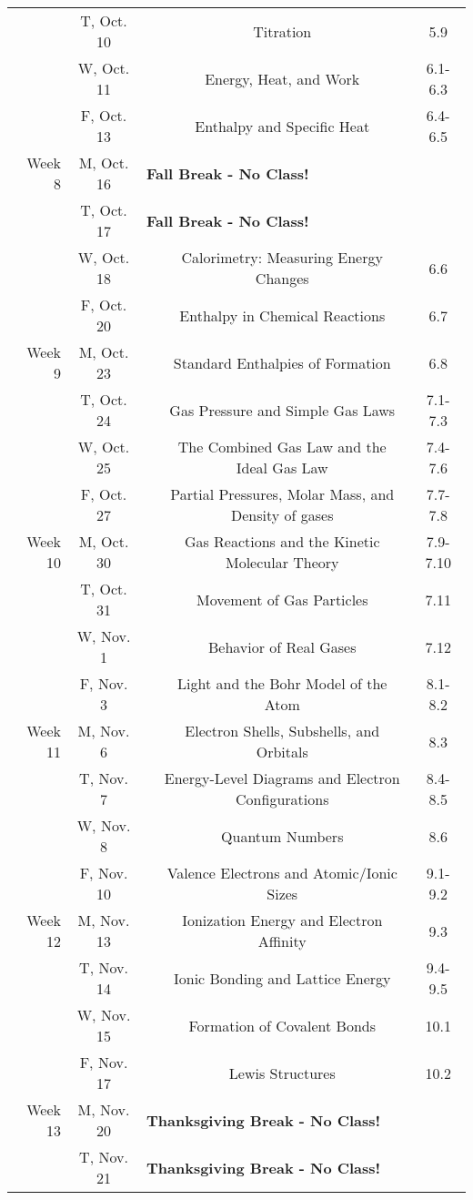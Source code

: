 \begin{tabular}{rcccc}
& T, Oct. 10&& Titration & 5.9\\
& W, Oct. 11&& Energy, Heat, and Work & 6.1-6.3\\
& F, Oct. 13&& Enthalpy and Specific Heat & 6.4-6.5\\
\midrule
Week 8 & M, Oct. 16& \multicolumn{3}{l}{\textbf{Fall Break - No Class!}}\\
& T, Oct. 17& \multicolumn{3}{l}{\textbf{Fall Break - No Class!}}\\
& W, Oct. 18&& Calorimetry: Measuring Energy Changes & 6.6\\
& F, Oct. 20&& Enthalpy in Chemical Reactions & 6.7\\
\midrule
Week 9 & M, Oct. 23&& Standard Enthalpies of Formation & 6.8\\
& T, Oct. 24&& Gas Pressure and Simple Gas Laws & 7.1-7.3\\
& W, Oct. 25&& The Combined Gas Law and the Ideal Gas Law & 7.4-7.6\\
& F, Oct. 27&& Partial Pressures, Molar Mass, and Density of gases & 7.7-7.8\\
\midrule
Week 10 & M, Oct. 30&& Gas Reactions and the Kinetic Molecular Theory & 7.9-7.10\\
& T, Oct. 31&& Movement of Gas Particles & 7.11\\
& W, Nov. 1&& Behavior of Real Gases & 7.12\\
& F, Nov. 3&& Light and the Bohr Model of the Atom & 8.1-8.2\\
\midrule
Week 11 & M, Nov. 6&& Electron Shells, Subshells, and Orbitals & 8.3\\
& T, Nov. 7&& Energy-Level Diagrams and Electron Configurations & 8.4-8.5\\
& W, Nov. 8&& Quantum Numbers & 8.6\\
& F, Nov. 10&& Valence Electrons and Atomic/Ionic Sizes & 9.1-9.2\\
\midrule
Week 12 & M, Nov. 13&& Ionization Energy and Electron Affinity & 9.3\\
& T, Nov. 14&& Ionic Bonding and Lattice Energy & 9.4-9.5\\
& W, Nov. 15&& Formation of Covalent Bonds & 10.1\\
& F, Nov. 17&& Lewis Structures & 10.2\\
\midrule
Week 13 & M, Nov. 20& \multicolumn{3}{l}{\textbf{Thanksgiving Break - No Class!}}\\
& T, Nov. 21& \multicolumn{3}{l}{\textbf{Thanksgiving Break - No Class!}}\\

\end{tabular}
